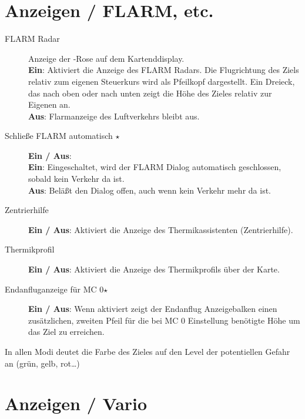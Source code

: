 \section{Anzeigen / FLARM, etc.} \label{sec:flarmandother-gauge}

\begin{description}
\item[FLARM Radar]  \label{conf:flarmdisplay} Anzeige der \fl -Rose auf dem Kartenddisplay.\\
{\bf Ein}: Aktiviert die Anzeige des FLARM Radars. Die Flugrichtung des Ziels relativ zum eigenen Steuerkurs wird als Pfeilkopf dargestellt.
Ein Dreieck, das nach oben oder nach unten zeigt die Höhe des Zieles relativ zur Eigenen an.
\\
{\bf Aus}: Flarmanzeige des Luftverkehrs  bleibt aus.
\item[Schließe FLARM automatisch $\star$] {\bf Ein / Aus}: \\
{\bf Ein}: Eingeschaltet, wird der FLARM Dialog automatisch geschlossen, sobald kein Verkehr da ist.\\
{\bf Aus}: Beläßt den Dialog offen, auch wenn kein Verkehr mehr da ist.
\item[Zentrierhilfe] \label{conf:thermalassistant} {\bf Ein / Aus}: Aktiviert die Anzeige des Thermikassistenten (Zentrierhilfe).
\item[Thermikprofil] \label{conf:thermalband} {\bf Ein / Aus}: Aktiviert die Anzeige des Thermikprofils über der Karte.
\item[Endanfluganzeige für MC 0$\star$] {\bf Ein / Aus}:
Wenn aktiviert zeigt der Endanflug Anzeigebalken einen zusätzlichen, zweiten Pfeil für die bei MC 0 Einstellung benötigte Höhe um das Ziel zu erreichen.
\end{description}

In allen Modi deutet die Farbe des Zieles auf den Level der potentiellen Gefahr an (grün, gelb, rot\dots)


\section{Anzeigen / Vario}\label{sec:vario-gauge}

